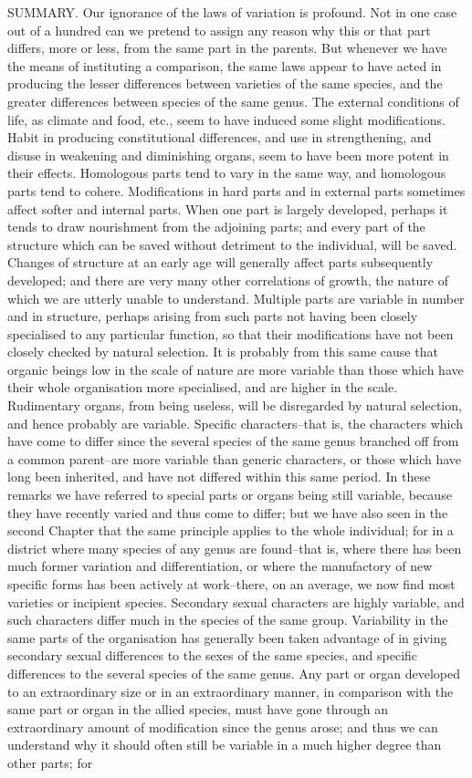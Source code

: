 SUMMARY.
Our ignorance of the laws of variation is profound. Not in one case out of a hundred can we pretend to assign any reason why this or that part differs, more or less, from the same part in the parents. But whenever we have the means of instituting a comparison, the same laws appear to have acted in producing the lesser differences between varieties of the same species, and the greater differences between species of the same genus. The external conditions of life, as climate and food, etc., seem to have induced some slight modifications. Habit in producing constitutional differences, and use in strengthening, and disuse in weakening and diminishing organs, seem to have been more potent in their effects. Homologous parts tend to vary in the same way, and homologous parts tend to cohere. Modifications in hard parts and in external parts sometimes affect softer and internal parts. When one part is largely developed, perhaps it tends to draw nourishment from the adjoining parts; and every part of the structure which can be saved without detriment to the individual, will be saved. Changes of structure at an early age will generally affect parts subsequently developed; and there are very many other correlations of growth, the nature of which we are utterly unable to understand. Multiple parts are variable in number and in structure, perhaps arising from such parts not having been closely specialised to any particular function, so that their modifications have not been closely checked by natural selection. It is probably from this same cause that organic beings low in the scale of nature are more variable than those which have their whole organisation more specialised, and are higher in the scale. Rudimentary organs, from being useless, will be disregarded by natural selection, and hence probably are variable. Specific characters--that is, the characters which have come to differ since the several species of the same genus branched off from a common parent--are more variable than generic characters, or those which have long been inherited, and have not differed within this same period. In these remarks we have referred to special parts or organs being still variable, because they have recently varied and thus come to differ; but we have also seen in the second Chapter that the same principle applies to the whole individual; for in a district where many species of any genus are found--that is, where there has been much former variation and differentiation, or where the manufactory of new specific forms has been actively at work--there, on an average, we now find most varieties or incipient species. Secondary sexual characters are highly variable, and such characters differ much in the species of the same group. Variability in the same parts of the organisation has generally been taken advantage of in giving secondary sexual differences to the sexes of the same species, and specific differences to the several species of the same genus. Any part or organ developed to an extraordinary size or in an extraordinary manner, in comparison with the same part or organ in the allied species, must have gone through an extraordinary amount of modification since the genus arose; and thus we can understand why it should often still be variable in a much higher degree than other parts; for 